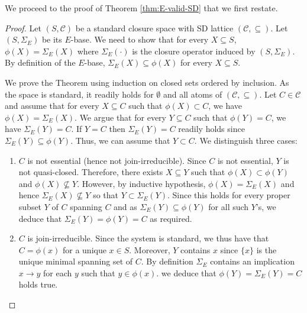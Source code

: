 \documentclass[12pt, a4paper]{article}
\newcommand{\cc}[1]{\mathcal{#1}}  %
\newcommand{\U}{S}  %
\newcommand{\cl}{\phi}  %
\newcommand{\cs}{\cc{C}} %
\newcommand{\imp}{\rightarrow}  %
\newcommand{\is}{\Sigma}  %
\begin{document}
We proceed to the proof of Theorem \ref{thm:E-valid-SD} that we first restate.

\THMEvalidSD*

\begin{proof}
Let $(\U, \cs)$ be a standard closure space with SD lattice $(\cs, \subseteq)$.
Let $(\U, \is_E)$ be its $E$-base.
We need to show that for every $X \subseteq \U$, $\cl(X) = \is_E(X)$ where $\is_E(\cdot)$ is the closure operator induced by $(\U, \is_E)$.
By definition of the $E$-base, $\is_E(X) \subseteq \cl(X)$ for every $X \subseteq \U$.

We prove the Theorem using induction on closed sets ordered by inclusion. 
As the space is standard, it readily holds for $\emptyset$ and all atoms of $(\cs, \subseteq)$.
Let $C \in \cs$ and assume that for every $X \subseteq C$ such that $\cl(X) \subset C$, we have $\cl(X) = \is_E(X)$.
We argue that for every $Y \subseteq C$ such that $\cl(Y) = C$, we have $\is_E(Y) = C$.
If $Y = C$ then $\is_E(Y) = C$ readily holds since $\is_E(Y) \subseteq \cl(Y)$.
Thus, we can assume that $Y \subset C$.
We distinguish three cases:
%
\begin{enumerate}[(1)]
\item $C$ is not essential (hence not join-irreducible).
Since $C$ is not essential, $Y$ is not quasi-closed.
Therefore, there exists $X \subseteq Y$ such that $\cl(X) \subset \cl(Y)$ and $\cl(X) \nsubseteq Y$.
However, by inductive hypothesis, $\cl(X) = \is_E(X)$ and hence $\is_E(X) \nsubseteq Y$ so that $Y \subset \is_E(Y)$. 
Since this holds for every proper subset $Y$ of $C$ spanning $C$ and as $\is_E(Y) \subseteq \cl(Y)$ for all such $Y$'s, we deduce that $\is_E(Y) = \cl(Y) = C$ as required.

\item $C$ is join-irreducible.
Since the system is standard, we thus have that $C = \cl(x)$ for a unique $x \in \U$.
Moreover, $Y$ contains $x$ since $\{x\}$ is the unique minimal spanning set of $C$.
By definition $\is_E$ contains an implication $x \imp y$ for each $y$ such that $y \in \cl(x)$.
we deduce that $\cl(Y) = \is_E(Y) = C$ holds true.


\end{enumerate}
\end{proof}
\end{document}
